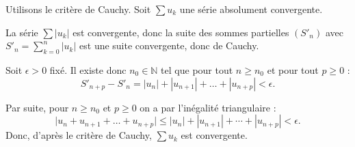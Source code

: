 \documentclass[french]{yLectureNote}
\newcommand{\N}[0]{\mathbb{N}}
\begin{document}
\begin{myproof}
Utilisons le critère de Cauchy.  Soit $\sum u_k$ une série absolument convergente.

La série $\sum |u_k|$ est convergente, donc la suite des sommes partielles $(S'_n)$ avec
$S'_n = \sum_{k=0}^{n} |u_k|$ est une suite
convergente, donc de Cauchy.

Soit $\epsilon>0$ fixé. Il existe donc $n_0 \in \N$ tel que
pour tout $n \geq n_0$ et pour tout $p \geq 0$ :
$$S'_{n+p}-S'_n=|u_n|+|u_{n+1}|+\dots+|u_{n+p}| < \epsilon.$$

Par suite, pour $n \geq n_0$ et  $p \geq 0$ on a par l'inégalité triangulaire :
$$\big|u_n+u_{n+1}+\dots+u_{n+p}\big| \leq |u_n|+|u_{n+1}|+\cdots+|u_{n+p}| < \epsilon.$$
Donc, d'après le critère de Cauchy,  $\sum u_k$ est convergente.
\end{myproof}
\end{document}
